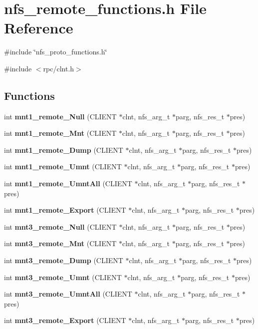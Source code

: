 \section{nfs\_\-remote\_\-functions.h File Reference}
\label{nfs__remote__functions_8h}
{\ttfamily \#include \char`\"{}nfs\_\-proto\_\-functions.h\char`\"{}}\par
{\ttfamily \#include $<$rpc/clnt.h$>$}\par
\subsection*{Functions}
\begin{DoxyCompactItemize}
\item 
int {\bf mnt1\_\-remote\_\-Null} (CLIENT $\ast$clnt, nfs\_\-arg\_\-t $\ast$parg, nfs\_\-res\_\-t $\ast$pres)
\item 
int {\bf mnt1\_\-remote\_\-Mnt} (CLIENT $\ast$clnt, nfs\_\-arg\_\-t $\ast$parg, nfs\_\-res\_\-t $\ast$pres)
\item 
int {\bf mnt1\_\-remote\_\-Dump} (CLIENT $\ast$clnt, nfs\_\-arg\_\-t $\ast$parg, nfs\_\-res\_\-t $\ast$pres)
\item 
int {\bf mnt1\_\-remote\_\-Umnt} (CLIENT $\ast$clnt, nfs\_\-arg\_\-t $\ast$parg, nfs\_\-res\_\-t $\ast$pres)
\item 
int {\bf mnt1\_\-remote\_\-UmntAll} (CLIENT $\ast$clnt, nfs\_\-arg\_\-t $\ast$parg, nfs\_\-res\_\-t $\ast$pres)
\item 
int {\bf mnt1\_\-remote\_\-Export} (CLIENT $\ast$clnt, nfs\_\-arg\_\-t $\ast$parg, nfs\_\-res\_\-t $\ast$pres)
\item 
int {\bf mnt3\_\-remote\_\-Null} (CLIENT $\ast$clnt, nfs\_\-arg\_\-t $\ast$parg, nfs\_\-res\_\-t $\ast$pres)
\item 
int {\bf mnt3\_\-remote\_\-Mnt} (CLIENT $\ast$clnt, nfs\_\-arg\_\-t $\ast$parg, nfs\_\-res\_\-t $\ast$pres)
\item 
int {\bf mnt3\_\-remote\_\-Dump} (CLIENT $\ast$clnt, nfs\_\-arg\_\-t $\ast$parg, nfs\_\-res\_\-t $\ast$pres)
\item 
int {\bf mnt3\_\-remote\_\-Umnt} (CLIENT $\ast$clnt, nfs\_\-arg\_\-t $\ast$parg, nfs\_\-res\_\-t $\ast$pres)
\item 
int {\bf mnt3\_\-remote\_\-UmntAll} (CLIENT $\ast$clnt, nfs\_\-arg\_\-t $\ast$parg, nfs\_\-res\_\-t $\ast$pres)
\item 
int {\bf mnt3\_\-remote\_\-Export} (CLIENT $\ast$clnt, nfs\_\-arg\_\-t $\ast$parg, nfs\_\-res\_\-t $\ast$pres)

\end{DoxyCompactItemize}

